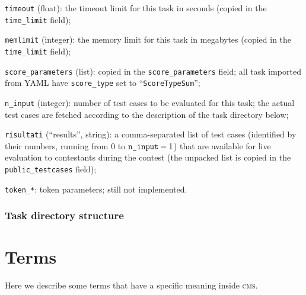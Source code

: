 \documentclass[a4paper,8pt]{amsart}
\newcommand{\CMS}{\textsc{cms}}
\newenvironment{squishlist}{%
  \begin{list}{\textbullet}%
    { \setlength{\itemsep}{0pt}%
      \setlength{\parsep}{3pt}%
      \setlength{\topsep}{3pt}%
      \setlength{\partopsep}{0pt}%
      \setlength{\leftmargin}{1.5em}%
      \setlength{\labelwidth}{1em}%
      \setlength{\labelsep}{0.5em} }%
}{\end{list}}
\newcommand{\id}[1]{\texttt{#1}}
\begin{document}
\begin{multicols}{2}
\begin{squishlist}
  \item \id{timeout} (float): the timeout limit for this task in
    seconds (copied in the \id{time\_limit} field);

  \item \id{memlimit} (integer): the memory limit for this task in
    megabytes (copied in the \id{time\_limit} field);

  \item \id{score\_parameters} (list): copied in the
    \id{score\_parameters} field; all task imported from YAML have
    \id{score\_type} set to ``\id{ScoreTypeSum}'';

  \item \id{n\_input} (integer): number of test cases to be evaluated
    for this task; the actual test cases are fetched according to the
    description of the task directory below;

  \item \id{risultati} (``results'', string): a comma-separated list
    of test cases (identified by their numbers, running from $0$ to
    $\text{\id{n\_input}}-1$) that are available for live evaluation
    to contestants during the contest (the unpacked list is copied in
    the \id{public\_testcases} field);

  \item \id{token\_*}: token parameters; still not implemented. %

  \end{squishlist}

  \subsubsection{Task directory structure}


  \section{Terms}

  Here we describe some terms that have a specific meaning inside
  \CMS{}.


\end{multicols}
\end{document}
